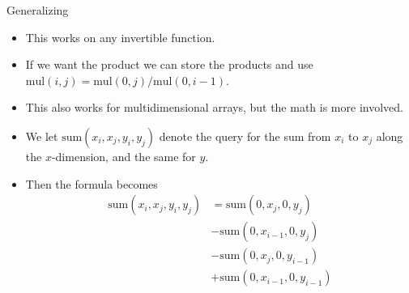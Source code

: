 \documentclass{beamer}
\begin{document}
\begin{frame}[plain]{Generalizing}
    \begin{itemize}
        \item<1-> This works on any invertible function.
        \item<2-> If we want the product we can store the products and use $\mathrm{mul}(i,j) = \mathrm{mul}(0,j) / \mathrm{mul}(0,i-1)$.
        \item<3-> This also works for multidimensional arrays, but the math is more involved.
        \item<4-> We let $\mathrm{sum}(x_i,x_j,y_i,y_j)$ denote the query for the sum from $x_i$ to $x_j$ along the $x$-dimension, and the same for $y$.
        \item<5-> Then the formula becomes
        \begin{align*}
            \mathrm{sum}(x_i,x_j,y_i,y_j) &= \mathrm{sum}(0,x_j,0,y_j) \\
                                          &- \mathrm{sum}(0,x_{i-1},0,y_j) \\
                                          &- \mathrm{sum}(0,x_j,0,y_{i-1}) \\
                                          &+ \mathrm{sum}(0,x_{i-1},0,y_{i-1})
        \end{align*}
    \end{itemize}
\end{frame}
\end{document}
